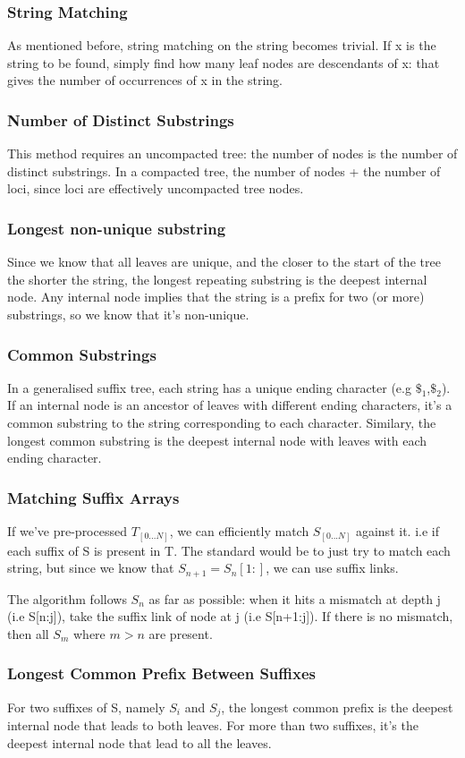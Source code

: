 \subsubsection{String Matching}
As mentioned before, string matching on the string becomes trivial. If x is the string to be found, simply find how many leaf nodes are descendants of x: that gives the number of occurrences of x in the string.

\subsubsection{Number of Distinct Substrings}
This method requires an uncompacted tree: the number of nodes is the number of distinct substrings. In a compacted tree, the number of nodes + the number of loci, since loci are effectively uncompacted tree nodes. 

\subsubsection{Longest non-unique substring}
Since we know that all leaves are unique, and the closer to the start of the tree the shorter the string, the longest repeating substring is the deepest internal node. Any internal node implies that the string is a prefix for two (or more) substrings, so we know that it's non-unique.

\subsubsection{Common Substrings}
In a generalised suffix tree, each string has a unique ending character (e.g $\$_1$,$\$_2$). If an internal node is an ancestor of leaves with different ending characters, it's a common substring to the string corresponding to each character. Similary, the longest common substring is the deepest internal node with leaves with each ending character. 

\subsubsection{Matching Suffix Arrays}
If we've pre-processed $T_{[0...N]}$, we can efficiently match $S_{[0...N]}$ against it. i.e if each suffix of S is present in T. The standard would be to just try to match each string, but since we know that $S_{n+1} = S_n[1:]$, we can use suffix links.

The algorithm follows $S_n$ as far as possible: when it hits a mismatch at depth j (i.e S[n:j]), take the suffix link of node at j (i.e S[n+1:j]). If there is no mismatch, then all $S_m$ where $m > n$ are present.

\subsubsection{Longest Common Prefix Between Suffixes}
For two suffixes of S, namely $S_i$ and $S_j$, the longest common prefix is the deepest internal node that leads to both leaves. For more than two suffixes, it's the deepest internal node that lead to all the leaves.
